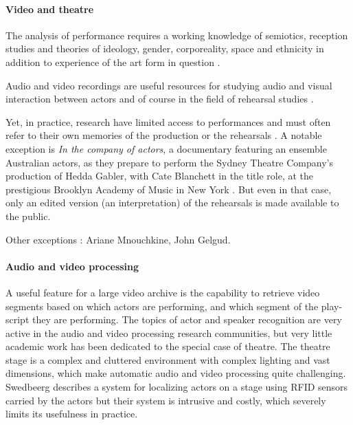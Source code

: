 \documentclass[conference]{IEEEtran}
\begin{document}
\paragraph*{Video and theatre}

The analysis of performance requires a working knowledge of semiotics, reception studies and theories 
of ideology, gender, corporeality, space and ethnicity in addition to experience of the art form in question \cite{Auslander97, Counsell01}.

Audio and video recordings are useful resources for studying audio and visual interaction between actors \cite{Fitzpatrick90}
and of course in the field of rehearsal studies \cite{McAuley98a,McAuley98b,McAuley06,McAuley08}.

Yet, in practice, research have limited access to performances and must often refer to their own memories of the production or the rehearsals
\cite{Selbourne82,Sher85,Stafford00,Stern00}. A notable exception is {\em In the company of actors}, a documentary featuring an ensemble Australian actors, as they prepare to perform the Sydney Theatre Company's production of Hedda Gabler, with Cate Blanchett in the title role, at the prestigious Brooklyn Academy of Music  in New York \cite{Darling07}. But even in that case, only an edited version (an interpretation)  of the rehearsals is made available to the public. 



Other exceptions : Ariane Mnouchkine, John Gelgud.



\paragraph*{Audio and video processing}
A useful feature for a large video archive is the capability to retrieve video segments based on which actors 
are performing, and which segment of the play-script they are performing. The topics of actor \cite{Hilton06} and speaker 
\cite{Miro12} recognition are very active in the audio and video processing research communities, but very little academic 
work has been dedicated to the special case of theatre. The theatre stage is a complex and cluttered environment 
with complex lighting and vast dimensions, which make automatic audio and video processing quite challenging. 
Swedbeerg describes a system for localizing actors on a stage using RFID sensors carried by the actors \cite{Swedberg}
but their system is intrusive and costly, which severely limits its usefulness in practice.
\end{document}
